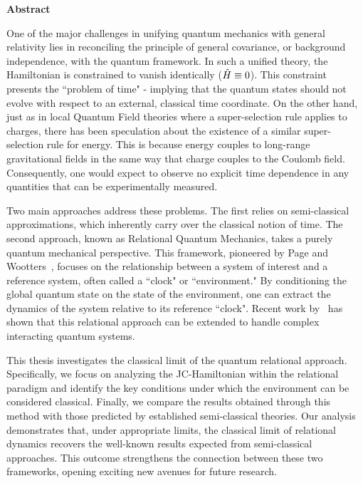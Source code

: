 \begin{center}
    {\Large\bfseries\sffamily Abstract}
\end{center}

One of the major challenges in unifying quantum mechanics with general relativity lies in reconciling the principle of general covariance, or background independence, with the quantum framework. In such a unified theory, the Hamiltonian is constrained to vanish identically ($\Hat{H} \equiv 0$). This constraint presents the ``problem of time" -  implying that the quantum states should not evolve with respect to an external, classical time coordinate.  On the other hand, just as in local Quantum Field theories where a super-selection rule applies to charges, there has been speculation about the existence of a similar super-selection rule for energy. This is because energy couples to long-range gravitational fields in the same way that charge couples to the Coulomb field. Consequently, one would expect to observe no explicit time dependence in any quantities that can be experimentally measured.

Two main approaches address these problems. The first relies on semi-classical approximations, which inherently carry over the classical notion of time. The second approach, known as Relational Quantum Mechanics, takes a purely quantum mechanical perspective. This framework, pioneered by Page and Wootters~\cite{page1983evolution}, focuses on the relationship between a system of interest and a reference system, often called a ``clock" or ``environment." By conditioning the global quantum state on the state of the environment, one can extract the dynamics of the system relative to its reference ``clock". Recent work by~\cite{Gemsheim:2023izg} has shown that this relational approach can be extended to handle complex interacting quantum systems.

This thesis investigates the classical limit of the quantum relational approach. Specifically, we focus on analyzing the JC-Hamiltonian within the relational paradigm and identify the key conditions under which the environment can be considered classical. Finally, we compare the results obtained through this method with those predicted by established semi-classical theories. Our analysis demonstrates that, under appropriate limits, the classical limit of relational dynamics recovers the well-known results expected from semi-classical approaches. This outcome strengthens the connection between these two frameworks, opening exciting new avenues for future research.
\newpage